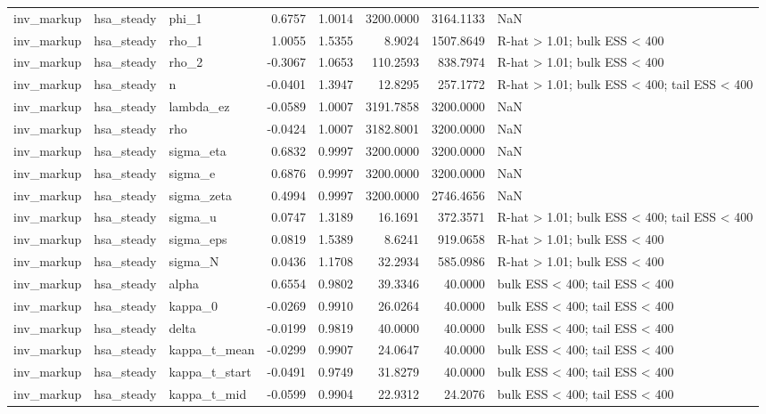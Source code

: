 \begin{tabular}{lllrrrrl}
inv\_markup & hsa\_steady & phi\_1 & 0.6757 & 1.0014 & 3200.0000 & 3164.1133 & NaN \\
inv\_markup & hsa\_steady & rho\_1 & 1.0055 & 1.5355 & 8.9024 & 1507.8649 & R-hat > 1.01; bulk ESS < 400 \\
inv\_markup & hsa\_steady & rho\_2 & -0.3067 & 1.0653 & 110.2593 & 838.7974 & R-hat > 1.01; bulk ESS < 400 \\
inv\_markup & hsa\_steady & n & -0.0401 & 1.3947 & 12.8295 & 257.1772 & R-hat > 1.01; bulk ESS < 400; tail ESS < 400 \\
inv\_markup & hsa\_steady & lambda\_ez & -0.0589 & 1.0007 & 3191.7858 & 3200.0000 & NaN \\
inv\_markup & hsa\_steady & rho & -0.0424 & 1.0007 & 3182.8001 & 3200.0000 & NaN \\
inv\_markup & hsa\_steady & sigma\_eta & 0.6832 & 0.9997 & 3200.0000 & 3200.0000 & NaN \\
inv\_markup & hsa\_steady & sigma\_e & 0.6876 & 0.9997 & 3200.0000 & 3200.0000 & NaN \\
inv\_markup & hsa\_steady & sigma\_zeta & 0.4994 & 0.9997 & 3200.0000 & 2746.4656 & NaN \\
inv\_markup & hsa\_steady & sigma\_u & 0.0747 & 1.3189 & 16.1691 & 372.3571 & R-hat > 1.01; bulk ESS < 400; tail ESS < 400 \\
inv\_markup & hsa\_steady & sigma\_eps & 0.0819 & 1.5389 & 8.6241 & 919.0658 & R-hat > 1.01; bulk ESS < 400 \\
inv\_markup & hsa\_steady & sigma\_N & 0.0436 & 1.1708 & 32.2934 & 585.0986 & R-hat > 1.01; bulk ESS < 400 \\
inv\_markup & hsa\_steady & alpha & 0.6554 & 0.9802 & 39.3346 & 40.0000 & bulk ESS < 400; tail ESS < 400 \\
inv\_markup & hsa\_steady & kappa\_0 & -0.0269 & 0.9910 & 26.0264 & 40.0000 & bulk ESS < 400; tail ESS < 400 \\
inv\_markup & hsa\_steady & delta & -0.0199 & 0.9819 & 40.0000 & 40.0000 & bulk ESS < 400; tail ESS < 400 \\
inv\_markup & hsa\_steady & kappa\_t\_mean & -0.0299 & 0.9907 & 24.0647 & 40.0000 & bulk ESS < 400; tail ESS < 400 \\
inv\_markup & hsa\_steady & kappa\_t\_start & -0.0491 & 0.9749 & 31.8279 & 40.0000 & bulk ESS < 400; tail ESS < 400 \\
inv\_markup & hsa\_steady & kappa\_t\_mid & -0.0599 & 0.9904 & 22.9312 & 24.2076 & bulk ESS < 400; tail ESS < 400 \\

\end{tabular}
